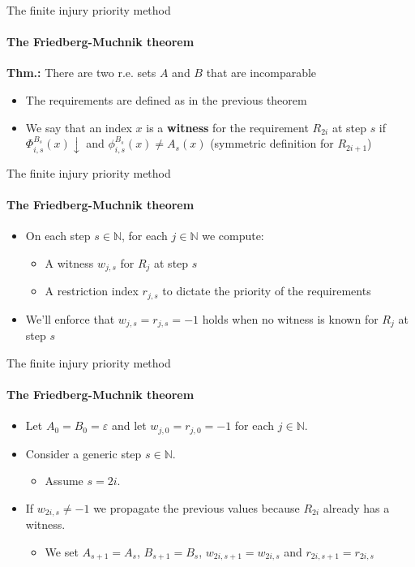 \documentclass{beamer}
\newcommand{\N}{\mathbb{N}}                     %
\begin{document}
\begin{frame}{The finite injury priority method}
\framesubtitle{The Friedberg-Muchnik theorem}
    \cite{friedberg,muchnik} \textbf{Thm.:} There are two r.e. sets $A$ and $B$ that are incomparable
    \begin{itemize}[<+->]
        \item The requirements are defined as in the previous theorem
        \item We say that an index $x$ is a \textbf{witness} for the requirement $R_{2i}$ at step $s$ if $\Phi_{i,s}^{B_s}(x) \downarrow$ and $\phi_{i,s}^{B_s}(x) \neq A_s(x)$ (symmetric definition for $R_{2i+1}$)

    \end{itemize}
\end{frame}

\begin{frame}{The finite injury priority method}
\framesubtitle{The Friedberg-Muchnik theorem}
    \begin{itemize}[<+->]
        \item On each step $s \in \N$, for each $j \in \N$ we compute:
        \begin{itemize}
            \item A witness $w_{j,s}$ for $R_j$ at step $s$
            \item A restriction index $r_{j,s}$ to dictate the priority of the requirements
        \end{itemize}
        \item We'll enforce that $w_{j,s} = r_{j,s} = -1$ holds when no witness is known for $R_j$ at step $s$
    \end{itemize}
\end{frame}

\begin{frame}{The finite injury priority method}
\framesubtitle{The Friedberg-Muchnik theorem}
    \begin{itemize}[<+->]
        \item Let $A_0 = B_0 = \varepsilon$ and let $w_{j,0} = r_{j,0} = -1$ for each $j \in \N$.
        \item Consider a generic step $s \in \N$.
        \begin{itemize}
            \item Assume $s = 2i$.
        \end{itemize}
        \item If $w_{2i,s} \neq -1$ we propagate the previous values because $R_{2i}$ already has a witness.
        \begin{itemize}
            \item We set $A_{s+1} = A_s$, $B_{s+1} = B_s$, $w_{2i,s+1} = w_{2i,s}$ and $r_{2i,s+1} = r_{2i,s}$
        \end{itemize} 
    \end{itemize}
\end{frame}
\end{document}
